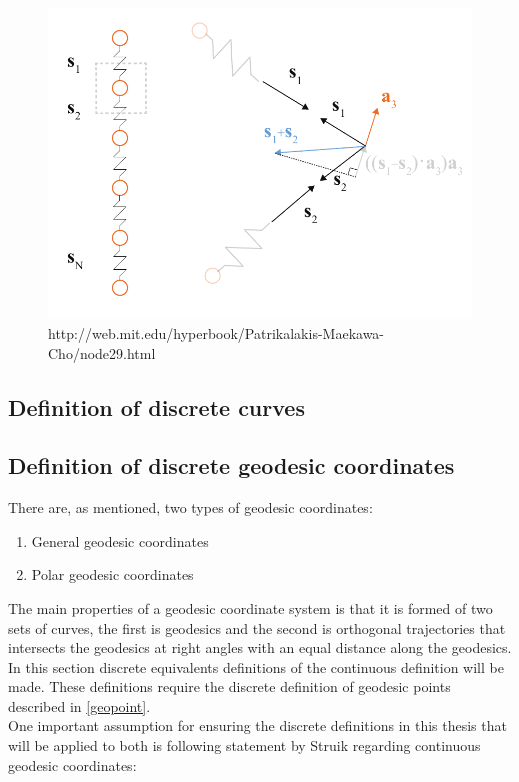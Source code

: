 \begin{figure}[H]
\centering
\includegraphics[width = 0.8\linewidth ]{figure/Method/GeodesicDR.pdf}
\caption{http://web.mit.edu/hyperbook/Patrikalakis-Maekawa-Cho/node29.html}
\end{figure}

\subsection{Definition of discrete curves}




\subsection{Definition of discrete geodesic coordinates}

There are, as mentioned, two types of geodesic coordinates:

\begin{enumerate}
\item General geodesic coordinates
\item Polar geodesic coordinates
\end{enumerate}

The main properties of a geodesic coordinate system is that it is formed of two sets of curves, the first is geodesics and the second is orthogonal trajectories that intersects the geodesics at right angles with an equal distance along the geodesics. In this section discrete equivalents definitions of the continuous definition will be made. These definitions require the discrete definition of geodesic points described in  \ref{geopoint}.\\

One important assumption for ensuring the discrete definitions in this thesis that will be applied to both is following statement by Struik regarding continuous geodesic coordinates:

